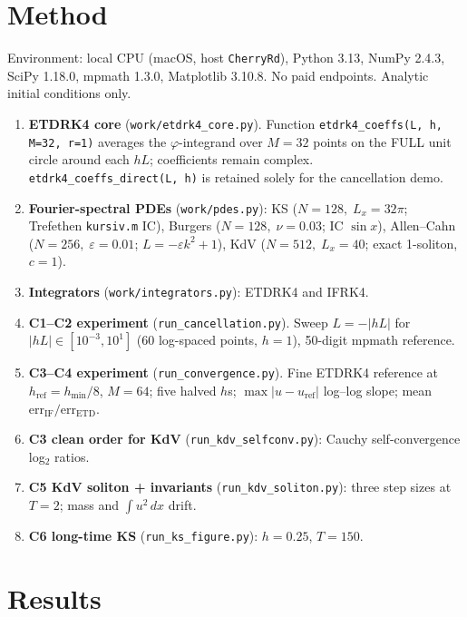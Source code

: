 \documentclass[11pt]{article}
\begin{document}
\section{Method}
Environment: local CPU (macOS, host \texttt{CherryRd}), Python 3.13,
NumPy 2.4.3, SciPy 1.18.0, mpmath 1.3.0, Matplotlib 3.10.8. No paid
endpoints. Analytic initial conditions only.

\begin{enumerate}
\item \textbf{ETDRK4 core} (\texttt{work/etdrk4\_core.py}). Function
  \texttt{etdrk4\_coeffs(L, h, M=32, r=1)} averages the $\varphi$-integrand
  over $M{=}32$ points on the FULL unit circle around each $hL$; coefficients
  remain complex. \texttt{etdrk4\_coeffs\_direct(L, h)} is retained solely
  for the cancellation demo.
\item \textbf{Fourier-spectral PDEs} (\texttt{work/pdes.py}): KS
  ($N{=}128,\;L_x{=}32\pi$; Trefethen \texttt{kursiv.m} IC),
  Burgers ($N{=}128,\;\nu{=}0.03$; IC $\sin x$),
  Allen--Cahn ($N{=}256,\;\varepsilon{=}0.01$; $L{=}-\varepsilon k^2 + 1$),
  KdV ($N{=}512,\;L_x{=}40$; exact 1-soliton, $c{=}1$).
\item \textbf{Integrators} (\texttt{work/integrators.py}): ETDRK4 and IFRK4.
\item \textbf{C1--C2 experiment} (\texttt{run\_cancellation.py}).
  Sweep $L{=}-|hL|$ for $|hL|\in[10^{-3},10^{1}]$ (60 log-spaced points, $h{=}1$),
  50-digit mpmath reference.
\item \textbf{C3--C4 experiment} (\texttt{run\_convergence.py}). Fine ETDRK4
  reference at $h_{\text{ref}}=h_{\min}/8$, $M{=}64$; five halved $h$s;
  $\max|u-u_{\text{ref}}|$ log--log slope; mean $\mathrm{err}_{\text{IF}}/\mathrm{err}_{\text{ETD}}$.
\item \textbf{C3 clean order for KdV} (\texttt{run\_kdv\_selfconv.py}):
  Cauchy self-convergence log$_2$ ratios.
\item \textbf{C5 KdV soliton + invariants} (\texttt{run\_kdv\_soliton.py}):
  three step sizes at $T{=}2$; mass and $\int u^2\,dx$ drift.
\item \textbf{C6 long-time KS} (\texttt{run\_ks\_figure.py}): $h{=}0.25$, $T{=}150$.
\end{enumerate}

\section{Results}
\end{document}
